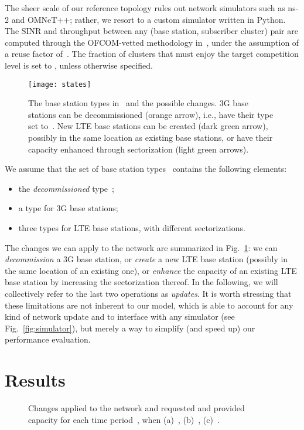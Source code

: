\documentclass[10pt,journal,cspaper,compsoc]{IEEEtran}
\newcommand{\Fig}[1]{Fig.~\ref{fig:#1}}
\begin{document}
The sheer scale of our reference topology rules out network simulators such as ns-2 and OMNeT++; rather, we resort to a custom simulator written in Python.
The SINR and throughput between any (base station, subscriber cluster) pair are computed through the OFCOM-vetted
methodology in~\cite{annex-14}, under the assumption of a reuse factor of~.
The fraction  of clusters that must enjoy the target competition level is set to , unless
otherwise specified.

\begin{figure}
\centering
\texttt{[image: states]}
\caption{
The base station types in~ and the possible changes. 3G base stations can be decommissioned
(orange arrow), i.e., have their type set to~. New LTE base stations can be
created (dark green arrow), possibly in the same location as existing base stations,
or have their capacity enhanced through sectorization (light green arrows).
\label{fig:states}
}
\end{figure}

We assume that the set of base station types~ contains the following elements:
\begin{itemize}
\item the {\em decommissioned} type~;
\item a type for 3G base stations;
\item three types for LTE base stations, with different sectorizations.
\end{itemize}
The changes we can apply to the network are summarized in \Fig{states}: we can {\em decommission}
a 3G base station, or {\em create} a new LTE base station (possibly in the same location of an
existing one), or {\em enhance} the capacity of an existing LTE base station by increasing
the sectorization thereof.
In the following, we will collectively refer to the last two operations as {\em updates}.
It is worth stressing that these limitations are not inherent to our model,
which is able to account for any kind of network update and to interface with any simulator
(see \Fig{simulator}), but merely a way to simplify (and speed up) our performance evaluation.

\section{Results}
\label{sec:results}

\begin{figure*}[t]
\centering
{}
\caption{
Changes applied to the network and requested and provided capacity for each time
period~, when (a)~, (b)~, (c)~.
\label{fig:vark}
}
\end{figure*}
\end{document}
